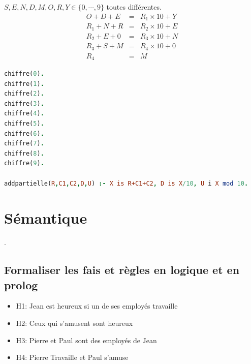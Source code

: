 \documentclass[12pt,a4paper,openany]{book}
\begin{document}
$S,E,N,D,M,O,R,Y \in\{0,\cdots,9\}$ toutes différentes.
\begin{eqnarray*}
	O+D+E&=& R_1\times 10+Y\\
	R_1+N+R &=&  R_2\times 10 + E\\
	R_2 + E + 0 &=&  R_3 \times 10 + N\\
	R_3 + S + M &=&  R_4 \times 10 + 0\\
	R_4 &=&  M
\end{eqnarray*}
		\begin{lstlisting}[language=Prolog, framerule=0pt]
chiffre(0).
chiffre(1).
chiffre(2).
chiffre(3).
chiffre(4).
chiffre(5).
chiffre(6).
chiffre(7).
chiffre(8).
chiffre(9).

addpartielle(R,C1,C2,D,U) :- X is R+C1+C2, D is X/10, U i X mod 10.
		\end{lstlisting}

	\chapter{Sémantique}.
	\section{Formaliser les fais et règles en logique et en prolog}
	\begin{itemize}
		\item H1: Jean est heureux si un de ses employés travaille
		\item H2: Ceux qui s'amusent sont heureux
		\item H3: Pierre et Paul sont des employés de Jean
		\item H4: Pierre Travaille et Paul s'amuse
	\end{itemize}
\end{document}
